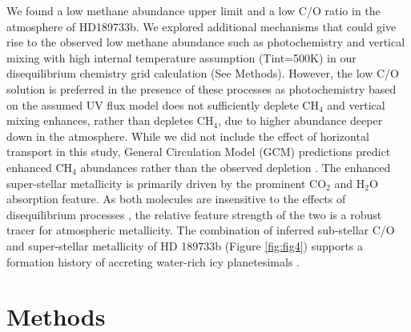 \documentclass[sn-standardnature]{sn-jnl}%
\begin{document}
We found a low methane abundance upper limit and a low C/O ratio in the atmosphere of HD189733b. We explored additional mechanisms that could give rise to the observed low methane abundance such as photochemistry and vertical mixing with high internal temperature assumption (Tint=500K) in our disequilibrium chemistry grid calculation (See Methods). However, the low C/O solution is preferred in the presence of these processes as photochemistry based on the assumed UV flux model \cite{moses_disequilibrium_2011} does not sufficiently deplete CH$_4$ and vertical mixing enhances, rather than depletes CH$_4$, due to higher abundance deeper down in the atmosphere. While we did not include the effect of horizontal transport in this study, General Circulation Model (GCM) predictions predict enhanced CH$_4$ abundances rather than the observed depletion \cite{lee_mini-chemical_2023}. The enhanced super-stellar metallicity is primarily driven by the prominent CO$_2$ and H$_2$O absorption feature. As both molecules are insensitive to the effects of disequilibrium processes \cite{moses_disequilibrium_2011}, the relative feature strength of the two is a robust tracer for atmospheric metallicity. The combination of inferred sub-stellar C/O and super-stellar metallicity of HD 189733b (Figure \ref{fig:fig4}) supports a formation history of accreting water-rich icy planetesimals \cite{oberg_effects_2011, mordasini_imprint_2016, madhusudhan_co_2012}. 








 


\newpage
\backmatter
\section*{Methods} \label{sec:methods}
\setcounter{page}{1}
\setcounter{figure}{0}
\renewcommand{\figurename}{Extended Data Fig.}
\renewcommand{\tablename}{Extended Data Table}
\end{document}
